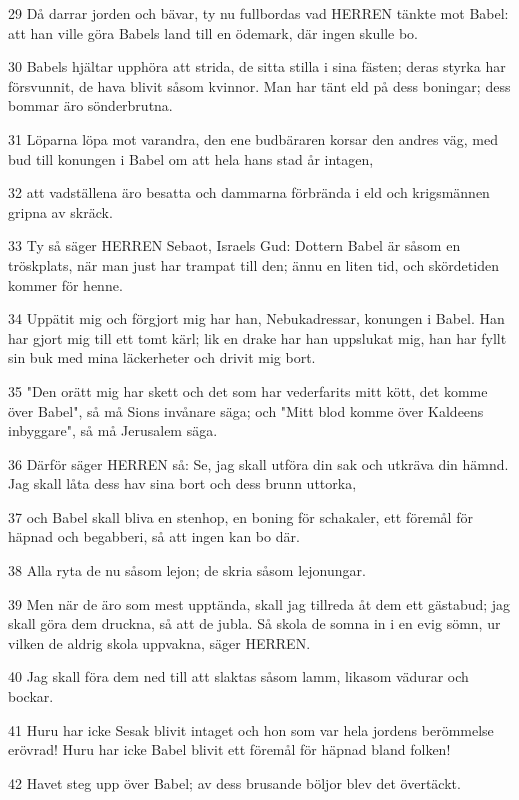 \par 29 Då darrar jorden och bävar, ty nu fullbordas vad HERREN tänkte mot Babel: att han ville göra Babels land till en ödemark, där ingen skulle bo.
\par 30 Babels hjältar upphöra att strida, de sitta stilla i sina fästen; deras styrka har försvunnit, de hava blivit såsom kvinnor. Man har tänt eld på dess boningar; dess bommar äro sönderbrutna.
\par 31 Löparna löpa mot varandra, den ene budbäraren korsar den andres väg, med bud till konungen i Babel om att hela hans stad år intagen,
\par 32 att vadställena äro besatta och dammarna förbrända i eld och krigsmännen gripna av skräck.
\par 33 Ty så säger HERREN Sebaot, Israels Gud: Dottern Babel är såsom en tröskplats, när man just har trampat till den; ännu en liten tid, och skördetiden kommer för henne.
\par 34 Uppätit mig och förgjort mig har han, Nebukadressar, konungen i Babel. Han har gjort mig till ett tomt kärl; lik en drake har han uppslukat mig, han har fyllt sin buk med mina läckerheter och drivit mig bort.
\par 35 "Den orätt mig har skett och det som har vederfarits mitt kött, det komme över Babel", så må Sions invånare säga; och "Mitt blod komme över Kaldeens inbyggare", så må Jerusalem säga.
\par 36 Därför säger HERREN så: Se, jag skall utföra din sak och utkräva din hämnd. Jag skall låta dess hav sina bort och dess brunn uttorka,
\par 37 och Babel skall bliva en stenhop, en boning för schakaler, ett föremål för häpnad och begabberi, så att ingen kan bo där.
\par 38 Alla ryta de nu såsom lejon; de skria såsom lejonungar.
\par 39 Men när de äro som mest upptända, skall jag tillreda åt dem ett gästabud; jag skall göra dem druckna, så att de jubla. Så skola de somna in i en evig sömn, ur vilken de aldrig skola uppvakna, säger HERREN.
\par 40 Jag skall föra dem ned till att slaktas såsom lamm, likasom vädurar och bockar.
\par 41 Huru har icke Sesak blivit intaget och hon som var hela jordens berömmelse erövrad! Huru har icke Babel blivit ett föremål för häpnad bland folken!
\par 42 Havet steg upp över Babel; av dess brusande böljor blev det övertäckt.
